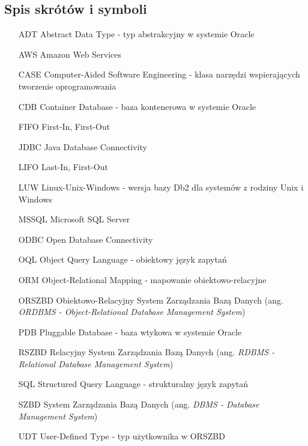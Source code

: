 \documentclass[a4paper,twoside,12pt]{book}
\newcommand{\obcy}[1]{\emph{#1}}
\newcommand{\ang}[1]{{\selectlanguage{british}\obcy{#1}}}
\newcounter{stronyPozaNumeracja}
\begin{document}
\backmatter
{}
\setcounter{page}{\value{stronyPozaNumeracja}}

\pagestyle{tylkoNumeryStron}




\begin{appendices} 



\chapter*{Spis skrótów i symboli}

\begin{itemize}
\item[ADT] Abstract Data Type - typ abstrakcyjny w systemie Oracle
\item[AWS] Amazon Web Services
\item[CASE] Computer-Aided Software Engineering - klasa narzędzi wspierających tworzenie oprogramowania 
\item[CDB] Container Database - baza kontenerowa w systemie Oracle 
\item[FIFO] First-In, First-Out
\item[JDBC] Java Database Connectivity
\item[LIFO] Last-In, First-Out
\item[LUW] Linux-Unix-Windows - wersja bazy Db2 dla systemów z rodziny Unix i Windows
\item[MSSQL] Microsoft SQL Server
\item[ODBC] Open Database Connectivity
\item[OQL] Object Query Language - obiektowy język zapytań
\item[ORM] Object-Relational Mapping - mapowanie obiektowo-relacyjne
\item[ORSZBD] Obiektowo-Relacyjny System Zarządzania Bazą Danych (ang. \ang{ORDBMS - Object-Relational Database Management System}) 
\item[PDB] Pluggable Database - baza wtykowa w systemie Oracle
\item[RSZBD] Relacyjny System Zarządzania Bazą Danych (ang. \ang{RDBMS - Relational Database Management System}) 
\item[SQL] Structured Query Language - strukturalny język zapytań
\item[SZBD] System Zarządzania Bazą Danych (ang. \ang{DBMS - Database Management System})
\item[UDT] User-Defined Type - typ użytkownika w ORSZBD
\end{itemize}




\end{appendices}
\end{document}
